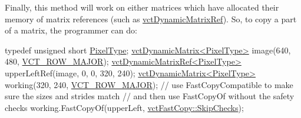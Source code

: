 Finally, this method will work on either matrices which have allocated their memory of matrix references (such as \hyperlink{classvct_dynamic_matrix_ref}{vct\-Dynamic\-Matrix\-Ref}). So, to copy a part of a matrix, the programmer can do\-: 
\begin{DoxyCode}
\textcolor{keyword}{typedef} \textcolor{keywordtype}{unsigned} \textcolor{keywordtype}{short} \hyperlink{namespacesvl_filter_source_video_capture_types_a6b2f5fb1010bb41e1fb7232f88fc515f}{PixelType};
\hyperlink{classvct_dynamic_matrix}{vctDynamicMatrix<PixelType>} image(640, 480, 
      \hyperlink{vct_forward_declarations_8h_a45ba752f741240bf765417ebc8130d62}{VCT\_ROW\_MAJOR});
\hyperlink{classvct_dynamic_matrix_ref}{vctDynamicMatrixRef<PixelType>} upperLeftRef(image, 0, 0, 320, 240);
\hyperlink{classvct_dynamic_matrix}{vctDynamicMatrix<PixelType>} working(320, 240, 
      \hyperlink{vct_forward_declarations_8h_a45ba752f741240bf765417ebc8130d62}{VCT\_ROW\_MAJOR});
\textcolor{comment}{// use FastCopyCompatible to make sure the sizes and strides match}
\textcolor{comment}{// and then use FastCopyOf without the safety checks}
working.FastCopyOf(upperLeft, \hyperlink{classvct_fast_copy_a221c1b0117c8dcf51332ad84f4e0fda5}{vctFastCopy::SkipChecks});
\end{DoxyCode}



